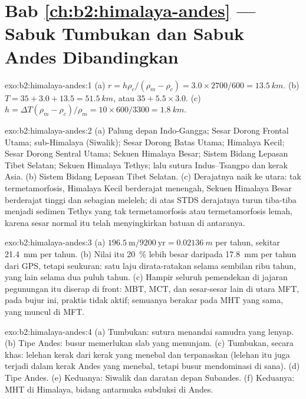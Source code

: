 \section*{Bab \ref{ch:b2:himalaya-andes} --- Sabuk Tumbukan dan Sabuk Andes Dibandingkan}

\begin{solution}{exo:b2:himalaya-andes:1}
(a) $r = h\rho_c/(\rho_m - \rho_c) = 3.0\times2700/600 = \qty{13.5}{km}$. (b) $T = 35 + 3.0 +
13.5 = \qty{51.5}{km}$, atau $35 + 5.5\times3.0$. (c) $h = \Delta T(\rho_m - \rho_c)/\rho_m =
10\times600/3300 = \qty{1.8}{km}$.
\end{solution}

\begin{solution}{exo:b2:himalaya-andes:2}
(a) Palung depan Indo-Gangga; Sesar Dorong Frontal Utama; sub-Himalaya (Siwalik); Sesar Dorong Batas
Utama; Himalaya Kecil; Sesar Dorong Sentral Utama; Sekuen Himalaya Besar; Sistem Bidang Lepasan
Tibet Selatan; Sekuen Himalaya Tethys; lalu sutura Indus--Tsangpo dan kerak
Asia. (b) Sistem Bidang Lepasan Tibet Selatan. (c) Derajatnya naik ke utara: 
tak termetamorfosis, Himalaya Kecil berderajat menengah, Sekuen Himalaya Besar berderajat tinggi dan sebagian
meleleh; di atas STDS derajatnya turun tiba-tiba menjadi sedimen Tethys yang tak termetamorfosis atau
termetamorfosis lemah, karena sesar normal itu telah menyingkirkan batuan di antaranya.
\end{solution}

\begin{solution}{exo:b2:himalaya-andes:3}
(a) $196.5\ \text{m}/9200\ \text{yr} = \qty{0.02136}{m}$ per tahun, sekitar \qty{21.4}{mm} per tahun.
(b) Nilai itu \qty{20}{\percent} lebih besar daripada \qty{17.8}{mm} per tahun dari GPS, tetapi seukuran:
satu laju dirata-ratakan selama sembilan ribu tahun, yang lain selama dua puluh tahun.
(c) Hampir seluruh pemendekan di jajaran pegunungan itu diserap di front: MBT, MCT, dan
sesar-sesar lain di utara MFT, pada bujur ini, praktis tidak aktif; semuanya berakar
pada MHT yang sama, yang muncul di MFT.
\end{solution}

\begin{solution}{exo:b2:himalaya-andes:4}
(a) Tumbukan: sutura menandai samudra yang lenyap. (b) Tipe Andes: busur memerlukan slab
yang menunjam. (c) Tumbukan, secara khas: lelehan kerak dari kerak yang menebal dan terpanaskan (lelehan itu juga
terjadi dalam kerak Andes yang menebal, tetapi  busur mendominasi di sana). (d) Tipe Andes.
(e) Keduanya: Siwalik dan daratan depan Subandes. (f) Keduanya: MHT di Himalaya, bidang
antarmuka subduksi di Andes.
\end{solution}

